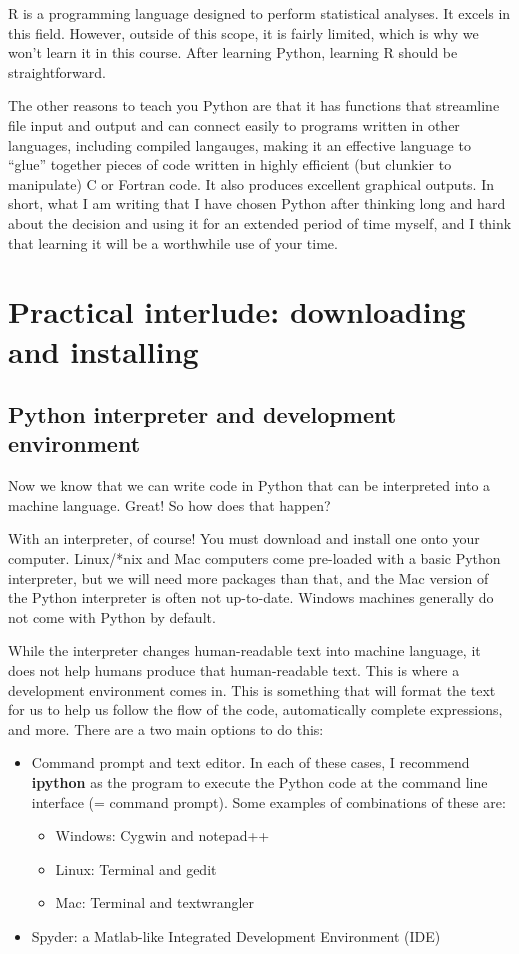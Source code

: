 \documentclass[a4paper,10pt]{scrartcl}
\begin{document}
R is a programming language designed to perform statistical analyses. It excels in this field. However, outside of this scope, it is fairly limited, which is why we won't learn it in this course. After learning Python, learning R should be straightforward.

The other reasons to teach you Python are that it has functions that streamline file input and output and can connect easily to programs written in other languages, including compiled langauges, making it an effective language to ``glue'' together pieces of code written in highly efficient (but clunkier to manipulate) C or Fortran code. It also produces excellent graphical outputs. In short, what I am writing that I have chosen Python after thinking long and hard about the decision and using it for an extended period of time myself, and I think that learning it will be a worthwhile use of your time.

\section{Practical interlude: downloading and installing}

\subsection{Python interpreter and development environment}

Now we know that we can write code in Python that can be interpreted into a machine language. Great! So how does that happen?

With an interpreter, of course! You must download and install one onto your computer. Linux/*nix and Mac computers come pre-loaded with a basic Python interpreter, but we will need more packages than that, and the Mac version of the Python interpreter is often not up-to-date. Windows machines generally do not come with Python by default.

While the interpreter changes human-readable text into machine language, it does not help humans produce that human-readable text. This is where a development environment comes in. This is something that will format the text for us to help us follow the flow of the code, automatically complete expressions, and more. There are a two main options to do this:

\begin{itemize}
 \item Command prompt and text editor. In each of these cases, I recommend \textbf{ipython} as the program to execute the Python code at the command line interface (= command prompt). Some examples of combinations of these are:
 \begin{itemize}
  \item Windows: Cygwin and notepad++
  \item Linux: Terminal and gedit
  \item Mac: Terminal and textwrangler
 \end{itemize}
 \item Spyder: a Matlab-like Integrated Development Environment (IDE)
\end{itemize}
\end{document}
